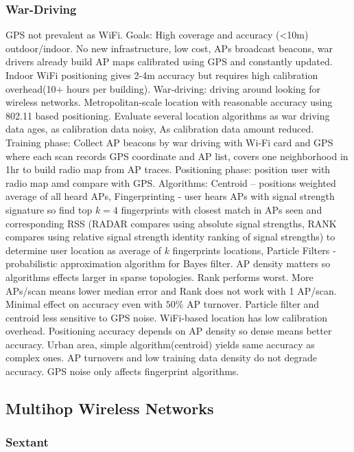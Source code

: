 \documentclass[9pt]{extarticle}
\begin{document}
\begin{multicols}{2}
\subsubsection{War-Driving}

GPS not prevalent as WiFi. Goals: High coverage and accuracy (<10m) outdoor/indoor. No new infrastructure, low cost, APs broadcast beacons, war drivers already build AP maps calibrated using GPS and constantly updated. Indoor WiFi positioning gives 2-4m accuracy but requires high calibration overhead(10+ hours per building). War-driving: driving around looking for wireless networks. Metropolitan-scale location with reasonable accuracy using 802.11 based positioning. Evaluate several location algorithms as war driving data ages, as calibration data noisy, As calibration data amount reduced. Training phase: Collect AP beacons by war driving with Wi-Fi card and GPS where each scan records GPS coordinate and AP list, covers one neighborhood in 1hr to build radio map from AP traces. Positioning phase: position user with radio map amd compare with GPS. Algorithms: Centroid – positions weighted average of all heard APs, Fingerprinting - user hears APs with signal strength signature so find top $k=4$ fingerprints with closest match in APs seen and corresponding RSS (RADAR compares using absolute signal strengths, RANK compares using relative signal strength identity ranking of signal strengths) to determine user location as average of $k$ fingerprints locations, Particle Filters - probabilistic approximation algorithm for Bayes filter. AP density matters so algorithms effects larger in sparse topologies. Rank performs worst. More APs/scan means lower median error and Rank does not work with 1 AP/scan. Minimal effect on accuracy even with $50\%$ AP turnover. Particle filter and centroid less sensitive to GPS noise. WiFi-based location has low calibration overhead. Positioning accuracy depends on AP density so dense means better accuracy. Urban area, simple algorithm(centroid) yields same accuracy as complex ones. AP turnovers and low training data density do not degrade accuracy. GPS noise only affects fingerprint algorithms.

\subsection{Multihop Wireless Networks}

\subsubsection{Sextant}


\end{multicols}
\end{document}
